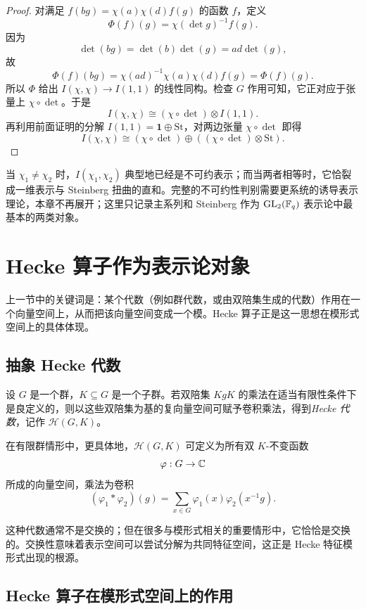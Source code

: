 \begin{proof}
对满足 $f(bg)=\chi(a)\chi(d)f(g)$ 的函数 $f$，定义
\[
\Phi(f)(g)=\chi(\det g)^{-1}f(g).
\]
因为
\[
\det(bg)=\det(b)\det(g)=ad\det(g),
\]
故
\[
\Phi(f)(bg)=\chi(ad)^{-1}\chi(a)\chi(d)f(g)=\Phi(f)(g).
\]
所以 $\Phi$ 给出 $I(\chi,\chi)\to I(1,1)$ 的线性同构。检查 $G$ 作用可知，它正对应于张量上 $\chi\circ\det$。于是
\[
I(\chi,\chi)\cong (\chi\circ\det)\otimes I(1,1).
\]
再利用前面证明的分解 $I(1,1)=\mathbf{1}\oplus \mathrm{St}$，对两边张量 $\chi\circ\det$ 即得
\[
I(\chi,\chi)\cong (\chi\circ\det)\oplus ((\chi\circ\det)\otimes \mathrm{St}).
\]
\end{proof}

\begin{remark}
当 $\chi_1\neq \chi_2$ 时，$I(\chi_1,\chi_2)$ 典型地已经是不可约表示；而当两者相等时，它恰裂成一维表示与 Steinberg 扭曲的直和。完整的不可约性判别需要更系统的诱导表示理论，本章不再展开；这里只记录主系列和 Steinberg 作为 $\mathrm{GL}_2(\mathbb{F}_q)$ 表示论中最基本的两类对象。
\end{remark}

\section{Hecke 算子作为表示论对象}

上一节中的关键词是：某个代数（例如群代数，或由双陪集生成的代数）作用在一个向量空间上，从而把该向量空间变成一个模。Hecke 算子正是这一思想在模形式空间上的具体体现。

\subsection*{抽象 Hecke 代数}

\begin{definition}
设 $G$ 是一个群，$K\subseteq G$ 是一个子群。若双陪集 $KgK$ 的乘法在适当有限性条件下是良定义的，则以这些双陪集为基的复向量空间可赋予卷积乘法，得到\emph{Hecke 代数}，记作 $\mathcal{H}(G,K)$。

在有限群情形中，更具体地，$\mathcal{H}(G,K)$ 可定义为所有双 $K$-不变函数
\[
\varphi:G\to \mathbb{C}
\]
所成的向量空间，乘法为卷积
\[
(\varphi_1*\varphi_2)(g)=\sum_{x\in G}\varphi_1(x)\varphi_2(x^{-1}g).
\]
\end{definition}

这种代数通常不是交换的；但在很多与模形式相关的重要情形中，它恰恰是交换的。交换性意味着表示空间可以尝试分解为共同特征空间，这正是 Hecke 特征模形式出现的根源。

\subsection*{Hecke 算子在模形式空间上的作用}

